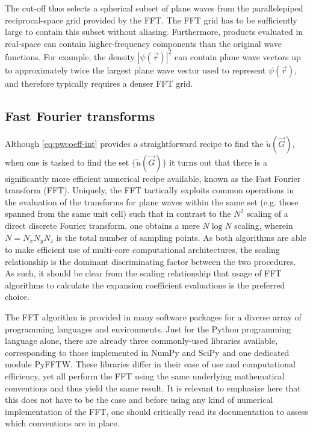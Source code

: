 The cut-off thus selects a spherical subset of plane waves from the parallelepiped reciprocal-space grid provided by the FFT. The FFT grid has to be sufficiently large to contain this subset without aliasing. Furthermore, products evaluated in real-space can contain higher-frequency components than the original wave functions. For example, the density $|\psi(\vec{r})|^{2}$ can contain plane wave vectors up to approximately twice the largest plane wave vector used to represent $\psi(\vec{r})$, and therefore typically requires a denser FFT grid.

%
%
%
\subsection{Fast Fourier transforms}

Although \cref{eq:pwcoeff-int} provides a straightforward recipe to find the $\tilde{u}(\vec{G})$, when one is tasked to find the set $\{\tilde{u}(\vec{G})\}$ it turns out that there is a significantly more efficient numerical recipe available, known as the Fast Fourier transform (FFT). Uniquely, the FFT tactically exploits common operations in the evaluation of the transforms for plane waves within the same set (e.g. those spanned from the same unit cell) such that in contrast to the $N^{2}$ scaling of a direct discrete Fourier transform, one obtains a mere $N \log N$ scaling, wherein $N=N_xN_yN_z$ is the total number of sampling points. As both algorithms are able to make efficient use of multi-core computational architectures, the scaling relationship is the dominant discriminating factor between the two procedures. As such, it should be clear from the scaling relationship that usage of FFT algorithms to calculate the expansion coefficient evaluations is the preferred choice.

The FFT algorithm is provided in many software packages for a diverse array of programming languages and environments. Just for the Python programming language alone, there are already three commonly-used libraries available, corresponding to those implemented in NumPy\cite{numpy} and SciPy\cite{scipy} and one dedicated module PyFFTW. These libraries differ in their ease of use and computational efficiency, yet all perform the FFT using the same underlying mathematical conventions and thus yield the same result. It is relevant to emphasize here that this does not have to be the case and before using any kind of numerical implementation of the FFT, one should critically read its documentation to assess which conventions are in place.

